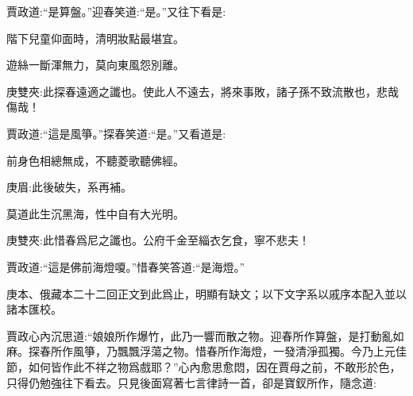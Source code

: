 \begin{parag}
    賈政道:“是算盤。”迎春笑道:“是。”又往下看是:
\end{parag}


\begin{poem}
    \begin{pl}階下兒童仰面時，清明妝點最堪宜。\end{pl}

    \begin{pl}遊絲一斷渾無力，莫向東風怨別離。\end{pl}
    \begin{note}庚雙夾:此探春遠適之讖也。使此人不遠去，將來事敗，諸子孫不致流散也，悲哉傷哉！\end{note}
\end{poem}


\begin{parag}
    賈政道:“這是風箏。”探春笑道:“是。”又看道是:
\end{parag}


\begin{poem}
    \begin{pl}前身色相總無成，不聽菱歌聽佛經。\end{pl}
    \begin{note}庚眉:此後破失，系再補。\end{note}

    \begin{pl}莫道此生沉黑海，性中自有大光明。\end{pl}
    \begin{note}庚雙夾:此惜春爲尼之讖也。公府千金至緇衣乞食，寧不悲夫！ \end{note}
\end{poem}


\begin{parag}
    賈政道:“這是佛前海燈嗄。”惜春笑答道:“是海燈。”
\end{parag}


\begin{note}
    庚本、俄藏本二十二回正文到此爲止，明顯有缺文；以下文字系以戚序本配入並以諸本匯校。
\end{note}


\begin{parag}
    賈政心內沉思道:“娘娘所作爆竹，此乃一響而散之物。迎春所作算盤，是打動亂如麻。探春所作風箏，乃飄飄浮蕩之物。惜春所作海燈，一發清淨孤獨。今乃上元佳節，如何皆作此不祥之物爲戲耶？”心內愈思愈悶，因在賈母之前，不敢形於色，只得仍勉強往下看去。只見後面寫著七言律詩一首，卻是寶釵所作，隨念道:
\end{parag}


